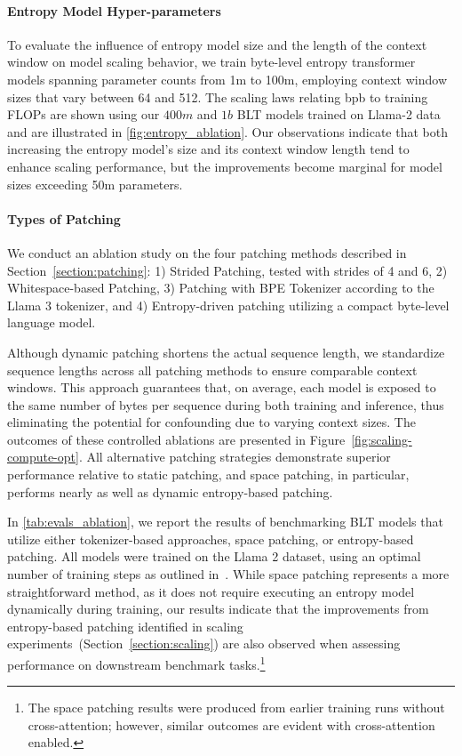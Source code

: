 \paragraph{Entropy Model Hyper-parameters} To evaluate the influence of entropy model size and the length of the context window on model scaling behavior, we train byte-level entropy transformer models spanning parameter counts from 1m to 100m, employing context window sizes that vary between 64 and 512. The scaling laws relating bpb to training FLOPs are shown using our $400m$ and $1b$ {\textsc BLT} models trained on Llama-2 data and are illustrated in \autoref{fig:entropy_ablation}. Our observations indicate that both increasing the entropy model's size and its context window length tend to enhance scaling performance, but the improvements become marginal for model sizes exceeding 50m parameters.

\paragraph{Types of Patching}

We conduct an ablation study on the four patching methods described in Section~\ref{section:patching}: 1) Strided Patching, tested with strides of 4 and 6, 2) Whitespace-based Patching, 3) Patching with BPE Tokenizer according to the Llama 3 tokenizer, and 4) Entropy-driven patching utilizing a compact byte-level language model.

Although dynamic patching shortens the actual sequence length, we standardize sequence lengths across all patching methods to ensure comparable context windows. This approach guarantees that, on average, each model is exposed to the same number of bytes per sequence during both training and inference, thus eliminating the potential for confounding due to varying context sizes. The outcomes of these controlled ablations are presented in Figure~\ref{fig:scaling-compute-opt}. All alternative patching strategies demonstrate superior performance relative to static patching, and space patching, in particular, performs nearly as well as dynamic entropy-based patching.

In \autoref{tab:evals_ablation}, we report the results of benchmarking {\textsc BLT} models that utilize either tokenizer-based approaches, space patching, or entropy-based patching. All models were trained on the Llama 2 dataset, using an optimal number of training steps as outlined in~\citep{dubey2024llama}. While space patching represents a more straightforward method, as it does not require executing an entropy model dynamically during training, our results indicate that the improvements from entropy-based patching identified in scaling experiments~(Section~\ref{section:scaling}) are also observed when assessing performance on downstream benchmark tasks.\footnote{The space patching results were produced from earlier training runs without cross-attention; however, similar outcomes are evident with cross-attention enabled.}

